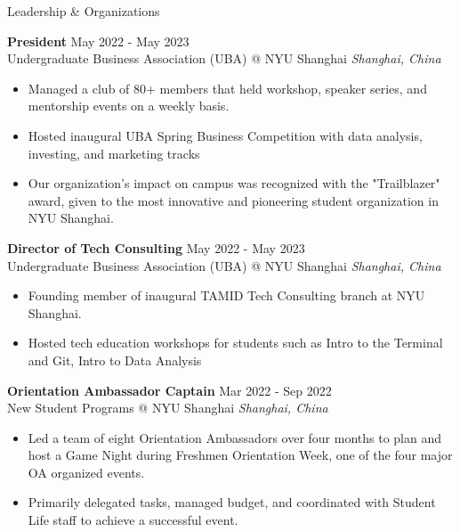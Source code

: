 \documentclass{cv} %
\begin{document}
\begin{rSection}{Leadership \& Organizations}

	\textbf{President} \hfill May 2022 - May 2023 \\
	Undergraduate Business Association (UBA) @ NYU Shanghai \hfill \textit{Shanghai, China}
	\begin{itemize}
		\item Managed a club of 80+ members that held workshop, speaker series, and mentorship events on a weekly basis.
		\item Hosted inaugural UBA Spring Business Competition with data analysis, investing, and marketing tracks
		\item Our organization's impact on campus was recognized with the "Trailblazer" award, given to the most innovative and pioneering student organization in NYU Shanghai.
	\end{itemize}

	\textbf{Director of Tech Consulting} \hfill May 2022 - May 2023 \\
	Undergraduate Business Association (UBA) @ NYU Shanghai \hfill \textit{Shanghai, China}
	\begin{itemize}
		\item Founding member of inaugural TAMID Tech Consulting branch at NYU Shanghai.
		\item Hosted tech education workshops for students such as Intro to the Terminal and Git, Intro to Data Analysis
	\end{itemize}

	\textbf{Orientation Ambassador Captain} \hfill Mar 2022 - Sep 2022 \\
	New Student Programs @ NYU Shanghai \hfill \textit{Shanghai, China}
	\begin{itemize}
		\item Led a team of eight Orientation Ambassadors over four months to plan and host a Game Night during Freshmen Orientation Week, one of the four major OA organized events.
		\item Primarily delegated tasks, managed budget, and coordinated with Student Life staff to achieve a successful event.
	\end{itemize}


\end{rSection}
\end{document}
